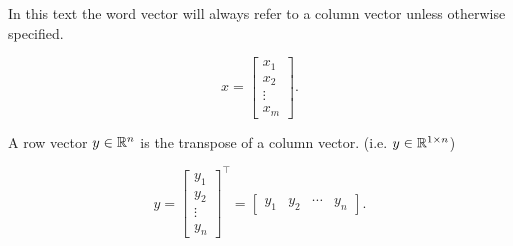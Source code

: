 \begin{terminology}
    In this text the word vector will always refer to a column vector unless otherwise specified.
\end{terminology}
\begin{equation*}
    x = \begin{bmatrix}
    x_{1} \\
    x_{2} \\
    \vdots \\
    x_{m}
    \end{bmatrix}.
\end{equation*}
\begin{definition}
    A row vector $y \in \mathbb{R}^n$ is the transpose of a column vector. (i.e. $y \in \mathbb{R}^{1 \times n}$)
\end{definition}
\begin{equation*}
    y =\begin{bmatrix}
    y_1 \\
    y_2 \\
    \vdots \\
    y_n
    \end{bmatrix}^\top =\begin{bmatrix}
    y_{1} & y_{2} & \cdots & y_{n}
    \end{bmatrix}.
\end{equation*}
